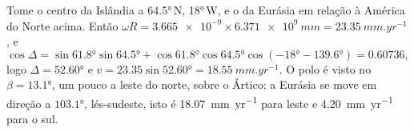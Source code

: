 \begin{example}\label{ex:b1:plate-kinematics:iceland}
Tome o centro da Islândia a \ang{64.5}\,N, \ang{18}\,W, e o 
da Eurásia em relação à América do Norte acima. Então $\omega R =
\num{3.665e-9}\times\qty{6.371e9}{mm} = \qty{23.35}{mm.yr^{-1}}$, e
\[
  \cos\Delta = \sin\ang{61.8}\sin\ang{64.5}
  + \cos\ang{61.8}\cos\ang{64.5}\cos(\ang{-18} - \ang{139.6}) = 0.60736,
\]
logo $\Delta = \ang{52.60}$ e $v = 23.35\sin\ang{52.60} = \qty{18.55}{mm.yr^{-1}}$.
O polo é visto no  $\beta = \ang{13.1}$, um pouco a leste do norte,
sobre o Ártico; a Eurásia se move em direção a $\ang{103.1}$, lés-sudeste, isto é
\qty{18.07}{mm.yr^{-1}} para leste e \qty{4.20}{mm.yr^{-1}} para o sul.
\end{example}

